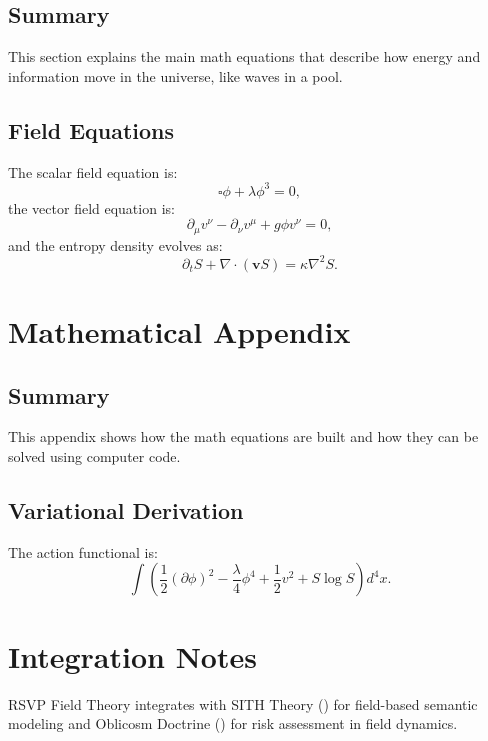 \documentclass[11pt,oneside]{memoir}
\theoremstyle{plain}
\begin{document}
\subsection{Summary}
This section explains the main math equations that describe how energy and information move in the universe, like waves in a pool.

\subsection{Field Equations}
The scalar field equation is:
\begin{equation}
    \square \phi + \lambda \phi^3 = 0,
\end{equation}
the vector field equation is:
\begin{equation}
    \partial_\mu v^\nu - \partial_\nu v^\mu + g \phi v^\nu = 0,
\end{equation}
and the entropy density evolves as:
\begin{equation}
    \partial_t S + \nabla \cdot (\mathbf{v} S) = \kappa \nabla^2 S.
\end{equation}

\section{Mathematical Appendix}
\subsection{Summary}
This appendix shows how the math equations are built and how they can be solved using computer code.

\subsection{Variational Derivation}
The action functional is:
\begin{equation}
    \int \left( \frac{1}{2} (\partial \phi)^2 - \frac{\lambda}{4} \phi^4 + \frac{1}{2} v^2 + S \log S \right) d^4 x.
\end{equation}

\section{Integration Notes}
RSVP Field Theory integrates with SITH Theory () for field-based semantic modeling and Oblicosm Doctrine () for risk assessment in field dynamics.
\end{document}
